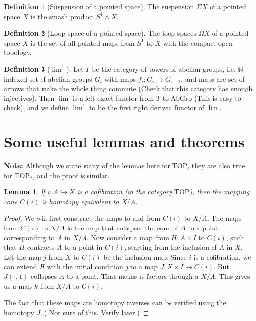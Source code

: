 \documentclass[12pt, notitlepage]{article}
\newtheorem{lem}[thm]{Lemma}
\theoremstyle{definition}
\newtheorem{defn}{Definition}[section]
\newcommand{\cat}[1]{\mathrm{#1}}
\begin{document}
\begin{defn}[Suspension of a pointed space]
  The suspension $\Sigma X$ of a pointed space $X$ is the smash product $S^1 \wedge X$.
\end{defn}

\begin{defn}[Loop space of a pointed space]
  The loop spaces $\Omega X$ of a pointed space $X$ is the set of all pointed maps from $S^1$ to $X$
  with the compact-open topology.
\end{defn}

\begin{defn}[$\lim^1$]
  Let $T$ be the category of towers of abelian groups, i.e. $\mathbb{N}$ indexed set of abelian
  groups $G_i$ with maps $f_i: G_i \to G_{i-1}$, and maps are set of arrows that make the whole
  thing commute {\color{red} (Check that this category has enough injectives)}. Then $\lim$ is a
  left exact functor from $T$ to $\cat{AbGrp}$ {\color{red} (This is easy to check)}, and we define
  $\lim^1$ to be the first right derived functor of $\lim$.
\end{defn}

\section{Some useful lemmas and theorems}
\label{sec:some-useful-lemmas}

\textbf{Note:} Although we state many of the lemmas here for $\cat{TOP}$, they are also true for
$\cat{TOP}_{\ast}$, and the proof is similar.

\begin{lem}
  If $i: A \hookrightarrow X$ is a cofibration (in the category $\cat{TOP}$), then the mapping cone
  $C(i)$ is homotopy equivalent to $X/A$.
\end{lem}

\begin{proof}
  We will first construct the maps to and from $C(i)$ to $X/A$. The maps from $C(i)$ to $X/A$ is the
  map that collapses the cone of $A$ to a point corresponding to $A$ in $X/A$. Now consider a map
  from $H: A \times I$ to $C(i)$, such that $H$ contracts $A$ to a point in $C(i)$, starting from
  the inclusion of $A$ in $X$. Let the map $j$ from $X$ to $C(i)$ be the inclusion map. Since $i$ is
  a cofibration, we can extend $H$ with the initial condition $j$ to a map $J: X \times I \to
  C(i)$. But $J(\cdot, 1)$ collapses $A$ to a point. That means it factors through a $X/A$. This
  gives us a map $k$ from $X/A$ to $C(i)$.

  The fact that these maps are homotopy inverses can be verified using the homotopy
  $J$. ({\color{red} Not sure of this. Verify later.})
\end{proof}
\end{document}
